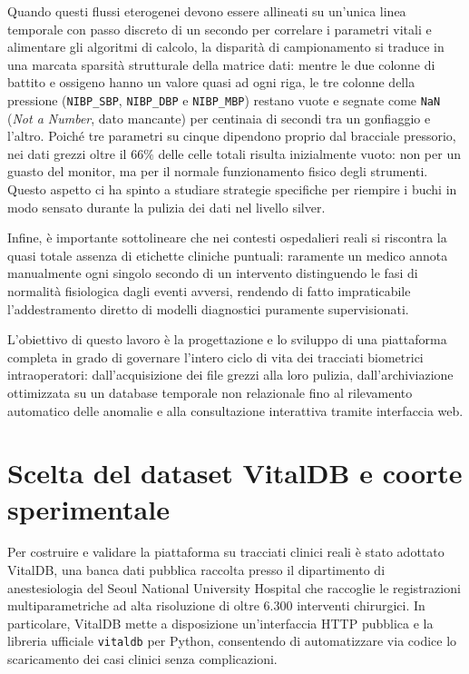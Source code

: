 Quando questi flussi eterogenei devono essere allineati su un'unica linea temporale con passo discreto di un secondo per correlare i parametri vitali e alimentare gli algoritmi di calcolo, la disparit\`a di campionamento si traduce in una marcata sparsit\`a strutturale della matrice dati: mentre le due colonne di battito e ossigeno hanno un valore quasi ad ogni riga, le tre colonne della pressione (\texttt{NIBP\_SBP}, \texttt{NIBP\_DBP} e \texttt{NIBP\_MBP}) restano vuote e segnate come \texttt{NaN} (\textit{Not a Number}, dato mancante) per centinaia di secondi tra un gonfiaggio e l'altro. Poich\'e tre parametri su cinque dipendono proprio dal bracciale pressorio, nei dati grezzi oltre il $66\%$ delle celle totali risulta inizialmente vuoto: non per un guasto del monitor, ma per il normale funzionamento fisico degli strumenti. Questo aspetto ci ha spinto a studiare strategie specifiche per riempire i buchi in modo sensato durante la pulizia dei dati nel livello silver.

Infine, \`e importante sottolineare che nei contesti ospedalieri reali si riscontra la quasi totale assenza di etichette cliniche puntuali: raramente un medico annota manualmente ogni singolo secondo di un intervento distinguendo le fasi di normalit\`a fisiologica dagli eventi avversi, rendendo di fatto impraticabile l'addestramento diretto di modelli diagnostici puramente supervisionati.

L'obiettivo di questo lavoro \`e la progettazione e lo sviluppo di una piattaforma completa in grado di governare l'intero ciclo di vita dei tracciati biometrici intraoperatori: dall'acquisizione dei file grezzi alla loro pulizia, dall'archiviazione ottimizzata su un database temporale non relazionale fino al rilevamento automatico delle anomalie e alla consultazione interattiva tramite interfaccia web.

\section{Scelta del dataset VitalDB e coorte sperimentale}
Per costruire e validare la piattaforma su tracciati clinici reali \`e stato adottato VitalDB, una banca dati pubblica raccolta presso il dipartimento di anestesiologia del Seoul National University Hospital che raccoglie le registrazioni multiparametriche ad alta risoluzione di oltre $6.300$ interventi chirurgici. In particolare, VitalDB mette a disposizione un'interfaccia HTTP pubblica e la libreria ufficiale \texttt{vitaldb} per Python, consentendo di automatizzare via codice lo scaricamento dei casi clinici senza complicazioni.

